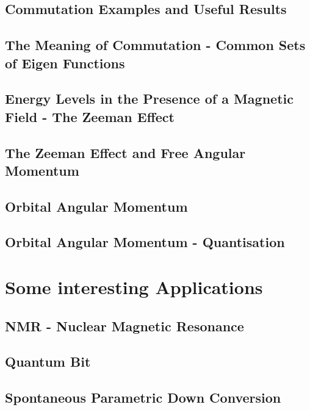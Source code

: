 \documentclass[colorlinks,11pt,a4paper,normalphoto,withhyper,ragged2e]{altareport}
\begin{document}
	
	\subsection{Commutation Examples and Useful Results}
	
	
	\subsection{The Meaning of Commutation - Common Sets of Eigen Functions}
	
	
	\subsection{Energy Levels in the Presence of a Magnetic Field - The Zeeman Effect}
	
	
	\subsection{The Zeeman Effect and Free Angular Momentum}
	
	
	\subsection{Orbital Angular Momentum}
	
	
	\subsection{Orbital Angular Momentum - Quantisation}
	
	
	\pagebreak
	

\section{Some interesting Applications}
	
	\subsection{NMR - Nuclear Magnetic Resonance}
	
	\subsection{Quantum Bit}
	
	\subsection{Spontaneous Parametric Down Conversion}
	
\end{document}
